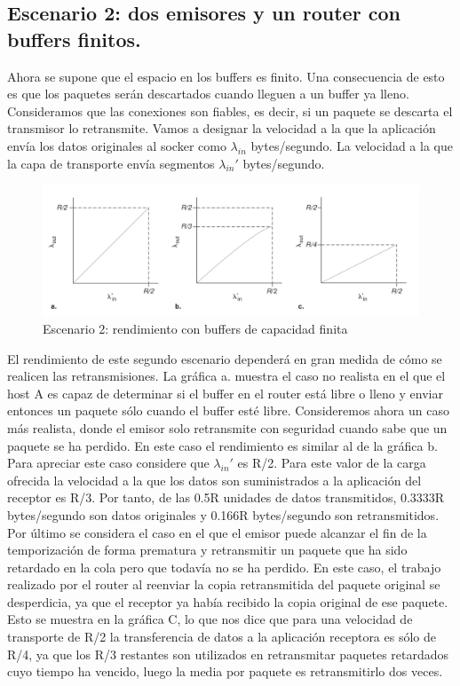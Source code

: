 \documentclass[a4paper,11pt]{article}
\begin{document}
\subsection{Escenario 2: dos emisores y un router con buffers finitos.}
Ahora se supone que el espacio en los buffers es finito. Una consecuencia de esto es que los paquetes serán descartados cuando lleguen a un buffer ya lleno. Consideramos que las conexiones son fiables, es decir, si un paquete se descarta el transmisor lo retransmite. Vamos a designar la velocidad a la que la aplicación envía los datos originales al socker como $\lambda_{in}$ bytes/segundo. La velocidad a la que la capa de transporte envía segmentos $\lambda_{in}'$ bytes/segundo.

\begin{figure}[h]
\centering
\caption{Escenario 2: rendimiento con buffers de capacidad finita}
\includegraphics[scale=1,width=1\textwidth]{escenario_2.png}
\end{figure}

El rendimiento de este segundo escenario dependerá en gran medida de cómo se realicen las retransmisiones. La gráfica a. muestra el caso no realista en el que el host A es capaz de determinar si el buffer en el router está libre o lleno y enviar entonces un paquete sólo cuando el buffer esté libre. Consideremos ahora un caso más realista, donde el emisor solo retransmite con seguridad cuando sabe que un paquete se ha perdido. En este caso el rendimiento es similar al de la gráfica b. Para apreciar este caso considere que $\lambda_{in}'$ es R/2. Para este valor de la carga ofrecida la velocidad a la que los datos son suministrados a la aplicación del receptor es R/3. Por tanto, de las 0.5R unidades de datos transmitidos, 0.3333R bytes/segundo son datos originales y 0.166R bytes/segundo son retransmitidos. \\

Por último se considera el caso en el que el emisor puede alcanzar el fin de la temporización de forma prematura y retransmitir un paquete que ha sido retardado en la cola pero que todavía no se ha perdido. En este caso, el trabajo realizado por el router al reenviar la copia retransmitida del paquete original se desperdicia, ya que el receptor ya había recibido la copia original de ese paquete. Esto se muestra en la gráfica C, lo que nos dice que para una velocidad de transporte de R/2 la transferencia de datos a la aplicación receptora es sólo de R/4, ya que los R/3 restantes son utilizados en retransmitar paquetes retardados cuyo tiempo ha vencido, luego la media por paquete es retransmitirlo dos veces.
\end{document}
